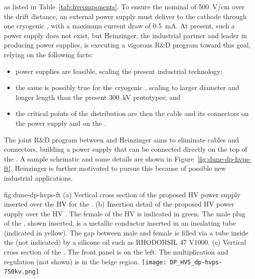 as listed in Table~\ref{tab:hvcomponents}. To ensure the nominal \efield of \SI{500}{\V/\cm} over  the \dpmaxdrift drift distance, an external power supply must deliver \dptargetdriftvoltneg to  the cathode through one  cryogenic \fdth, with a maximum current draw of \SI{0.5}{\milli\ampere}.
At present, such a power supply does not exist, but  Heinzinger, the industrial partner and leader in producing  power supplies, is executing a vigorous R\&D program toward this goal, relying on the following facts:

\begin{itemize}
\item \dptargetdriftvoltpos power supplies are feasible, scaling the present industrial technology;
\item the same is possibly true for the  cryogenic \fdth, scaling to larger diameter and longer length than the present \SI{300}{\kV} prototypes; and 
\item the critical points of the  distribution are then the cable and its connectors on the power supply and on the  \fdth. 
\end{itemize}

The joint R\&D program between  and Heinzinger aims to eliminate cables and connectors, building a power supply that can be connected directly on the top of the  \fdth.  A sample schematic and some details are shown in Figure~\ref{fig:dune-dp-hvps-ft}. 
Heinzinger is further motivated to pursue this because of possible new industrial applications.

\begin{dunefigure}
{fig:dune-dp-hvps-ft}
{(a) Vertical cross section of the proposed HV power supply inserted over the \dptargetdriftvoltpos HV \fdth for the \dpmod{}. 
(b) Insertion detail of the proposed HV power supply over the \dptargetdriftvoltpos HV \fdth. The female  of the HV \fdth is indicated in green. The male plug of the , shown inserted, is a metallic conductor inserted in an  insulating tube (indicated in yellow). The gap between male and female is filled via a tube inside the  (not indicated) by a silicone oil such as RHODORSIL 47 V1000. (c) Vertical cross section of the . The front panel is on the left. The  multiplication and regulation (not shown) is in the beige region.}
\texttt{[image: DP\_HVS\_dp-hvps-750kv.png]}
\end{dunefigure}

